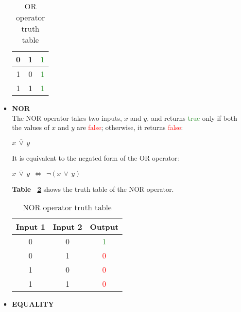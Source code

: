 \documentclass[]{usiinfbachelorproject}
\begin{document}
\begin{itemize}
\begin{table}[H]
\begin{tabular}{|c|c|c|}
                0 & 1 & \textcolor{ForestGreen}{1} \\
                \hline
                1 & 0 & \textcolor{ForestGreen}{1} \\
                \hline
                1 & 1 & \textcolor{ForestGreen}{1} \\
                \hline
            \end{tabular}
            \caption{OR operator truth table}
            \label{tab:or-table}
        \end{table}
    \item \textbf{NOR}
        \vspace{0.2cm} \\
        The NOR operator takes two inputs, $x$ and $y$, and returns \textcolor{ForestGreen}{true} only if both the values of $x$ and $y$ are \textcolor{red}{false}; otherwise, it returns \textcolor{red}{false}:
        \begin{center}
            $x \ \overline{\lor} \ y$
        \end{center}
        It is equivalent to the negated form of the OR operator:
        \begin{center}
            $x \ \overline{\lor} \ y \ \ \Longleftrightarrow \ \ \neg(x \ \lor \ y)$
        \end{center}
        \textbf{Table ~\ref{tab:nor-table}} shows the truth table of the NOR operator.
        \begin{table}[H]
            \centering
            \begin{tabular}{|c|c|c|}
                \hline
                \textbf{Input 1} & \textbf{Input 2} & \textbf{Output} \\
                \hline
                0 & 0 & \textcolor{ForestGreen}{1} \\
                \hline
                0 & 1 & \textcolor{red}{0} \\
                \hline
                1 & 0 & \textcolor{red}{0} \\
                \hline
                1 & 1 & \textcolor{red}{0} \\
                \hline
            \end{tabular}
            \caption{NOR operator truth table}
            \label{tab:nor-table}
        \end{table}
    \item \textbf{EQUALITY}
        \vspace{0.2cm} \\

\end{itemize}
\end{document}
